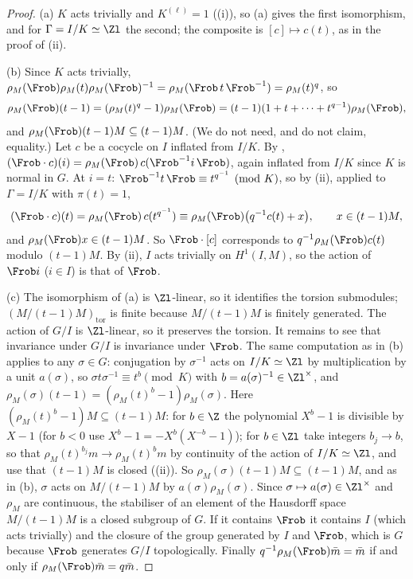 \begin{proof}
(a) $K$ acts trivially and $K^{(\ell)}=1$ ((i)), so (a) gives the first isomorphism, and
 for $\Gamma=I/K\simeq\Zl$ the second; the composite is $[c]\mapsto c(t)$, as in the proof of (ii).

(b) Since $K$ acts trivially, $\rho_M(\Frob)\rho_M(t)\rho_M(\Frob)^{-1}=\rho_M(\Frob\,t\,\Frob^{-1})=\rho_M(t)^q$, so
\[
\rho_M(\Frob)(t-1)=(\rho_M(t)^q-1)\rho_M(\Frob)=(t-1)(1+t+\dots+t^{q-1})\rho_M(\Frob),
\]
and $\rho_M(\Frob)(t-1)M\subseteq(t-1)M$. (We do not need, and do not claim, equality.) Let $c$ be a cocycle on $I$ inflated from $I/K$. By
, $(\Frob\cdot c)(i)=\rho_M(\Frob)\,c(\Frob^{-1}i\,\Frob)$, again inflated from $I/K$ since $K$ is normal in $G$. At $i=t$:
$\Frob^{-1}t\,\Frob\equiv t^{q^{-1}}\pmod K$, so by (ii), applied to $\Gamma=I/K$ with $\pi(t)=1$,
\[
(\Frob\cdot c)(t)=\rho_M(\Frob)\,c(t^{q^{-1}})\equiv\rho_M(\Frob)\bigl(q^{-1}c(t)+x\bigr),\qquad x\in(t-1)M,
\]
and $\rho_M(\Frob)x\in(t-1)M$. So $\Frob\cdot[c]$ corresponds to $q^{-1}\rho_M(\Frob)c(t)$ modulo $(t-1)M$. By (ii), $I$ acts trivially on
$H^1(I,M)$, so the action of $\Frob i$ ($i\in I$) is that of $\Frob$.

(c) The isomorphism of (a) is $\Zl$-linear, so it identifies the torsion submodules; $(M/(t-1)M)_{\mathrm{tor}}$ is finite because $M/(t-1)M$ is finitely generated. The
action of $G/I$ is $\Zl$-linear, so it preserves the torsion. It remains to see that invariance under $G/I$ is invariance under $\Frob$. The same computation as
in (b) applies to any $\sigma\in G$: conjugation by $\sigma^{-1}$ acts on $I/K\simeq\Zl$ by multiplication by a unit $a(\sigma)$, so $\sigma t\sigma^{-1}\equiv t^{b}\pmod K$ with
$b=a(\sigma)^{-1}\in\Zl^\times$, and $\rho_M(\sigma)(t-1)=(\rho_M(t)^b-1)\rho_M(\sigma)$. Here $(\rho_M(t)^b-1)M\subseteq(t-1)M$: for $b\in\Z$ the polynomial $X^b-1$ is divisible by
$X-1$ (for $b<0$ use $X^b-1=-X^b(X^{-b}-1)$); for $b\in\Zl$ take integers $b_j\to b$, so that $\rho_M(t)^{b_j}m\to\rho_M(t)^bm$ by continuity of the action of $I/K\simeq\Zl$, and use
that $(t-1)M$ is closed ((ii)). So $\rho_M(\sigma)(t-1)M\subseteq(t-1)M$, and as in (b), $\sigma$ acts on $M/(t-1)M$ by
$a(\sigma)\rho_M(\sigma)$. Since $\sigma\mapsto a(\sigma)\in\Zl^\times$ and $\rho_M$ are continuous, the stabiliser of an element of the Hausdorff space $M/(t-1)M$ is a
closed subgroup of $G$. If it contains $\Frob$ it contains $I$ (which acts trivially) and the closure of the group generated by $I$ and $\Frob$, which is $G$
because $\Frob$ generates $G/I$ topologically. Finally $q^{-1}\rho_M(\Frob)\bar m=\bar m$ if and only if $\rho_M(\Frob)\bar m=q\bar m$.
\end{proof}

